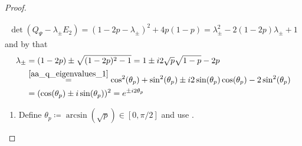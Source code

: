 \begin{proof}
\begin{enumerate}[label=(\roman*)]
        \newcommand{\lpm}{\lambda_\pm}
        \begin{align}
            \det(Q_\Psi - \lpm E_2) = (1-2p-\lpm)^2+4p(1-p) = \lpm^2-2(1-2p)\lpm+1
        \end{align}
        and by that
        \begin{align}
            \lpm &= (1-2p) \pm \sqrt{(1-2p)^2-1} = 1 \pm i 2 \sqrt{p}\sqrt{1-p}-2p\\
            &\overset{\ref{aa_q_eigenvalues_1}}{=} \cos^2(\theta_p)+\sin^2(\theta_p) \pm i 2 \sin(\theta_p)\cos(\theta_p) - 2 \sin^2(\theta_p)\\
            &= (\cos(\theta_p) \pm i\sin(\theta_p))^2 = e^{\pm i 2 \theta_p}
        \end{align}
        
        \begin{enumerate}[label=(\arabic*), wide]
            \item \label{aa_q_eigenvalues_1} Define \(\theta_p \coloneqq \arcsin(\sqrt{p}) \in [0, \pi/2]\) and use .
        \end{enumerate}
        

\end{enumerate}
\end{proof}
